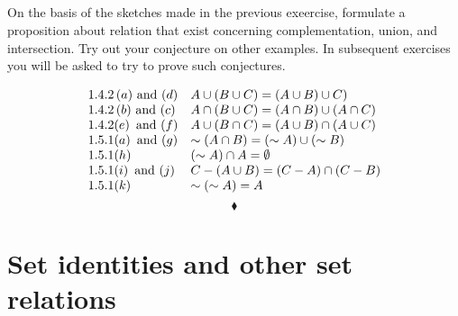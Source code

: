 \subsection{}
\begin{tcolorbox}
On the basis of the sketches made in the previous exeercise, formulate a proposition about relation that exist concerning complementation, union, and intersection. Try out your conjecture on other examples. In subsequent exercises you will be asked to try to prove such conjectures.
\end{tcolorbox}
\begin{align*}
\begin{array}{ll}
 1.4.2\, (a)\text{ and } (d) &A\cup(B\cup C)= (A\cup B)\cup C)\\
 1.4.2\, (b)\text{ and } (c)& A\cap(B\cup C)= (A\cap B)\cup (A\cap C)\\
 1.4.2(e)\,\text{ and } (f) &A\cup (B\cap C)= (A\cup B)\cap (A\cup C)\\
  1.5.1(a)\,\text{ and } (g) &\sim(A\cap B)=(\sim A)\cup(\sim B)\\
  1.5.1(h)&(\sim A)\cap A=\emptyset\\
  1.5.1(i)\,\text{ and } (j) &C-(A\cup B) = (C-A)\cap (C-B)\\
    1.5.1(k)&\sim (\sim A)=A\\
\end{array}
\end{align*}
$$\blacklozenge$$
\newpage

 \section{Set identities and other set relations}
